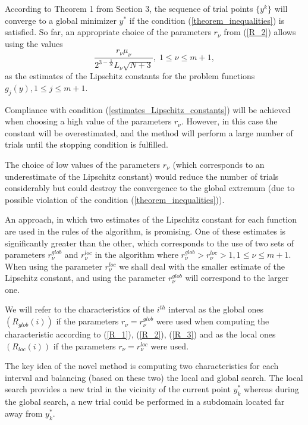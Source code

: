 \documentclass[review]{elsarticle}
\begin{document}
	According to Theorem 1 from Section 3, the sequence of trial points $\{y^k\}$ will converge to a global minimizer $y^\ast$ if the condition (\ref{theorem_inequalities}) is satisfied. So far, an appropriate choice of the parameters $r_{\nu}$ from (\ref{R_2}) allows using the values
\begin{equation}\label{estimates_Lipschitz_constants}
	\frac{r_{\nu}\mu_{\nu}}{2^{3-\frac{1}{N}}L_{\nu}\sqrt{N+3}}, \; 1 \leq \nu \leq m+1, 
\end{equation}
as the estimates of the Lipschitz constants for the problem functions $g_{j}(y), 1 \leq j \leq m+1$.

	Compliance with condition (\ref{estimates_Lipschitz_constants}) will be achieved when choosing a high value of the parameters $r_{\nu}$. However, in this case the constant will be overestimated, and the method will perform a large number of trials until the stopping condition is fulfilled.
	
	The choice of low values of the parameters $r_{\nu}$ (which corresponds to an underestimate of the Lipschitz constant) would reduce the number of trials considerably but could destroy the convergence to the global extremum (due to possible violation of the condition (\ref{theorem_inequalities})).
	
	An approach, in which two estimates of the Lipschitz constant for each function are used in the rules of the algorithm, is promising. One of these estimates is significantly greater than the other, which corresponds to the use of two sets of parameters $r_{\nu}^{glob}$ and $r_{\nu}^{loc}$ in the algorithm where $r_{\nu}^{glob}>r_{\nu}^{loc}>1, 1 \leq \nu \leq m+1$. When using the parameter $r_{\nu}^{loc}$ we shall deal with the smaller estimate of the Lipschitz constant, and using the parameter $r_{\nu}^{glob}$ will correspond to the larger one.
	
	We will refer to the characteristics of the $i^{th}$ interval as the global ones $(R_{glob}(i))$ if the parameters $r_{\nu}=r_{\nu}^{glob}$ were used when computing the characteristic according to (\ref{R_1}), (\ref{R_2}), (\ref{R_3}) and as the local ones  $(R_{loc}(i))$ if the parameters $r_{\nu}=r_{\nu}^{loc}$ were used. 

	The key idea of the novel method is computing two characteristics for each interval and balancing (based on these two) the local and global search. The local search provides a new trial in the vicinity of the current point $y_k^\ast$  whereas during the global search, a new trial could be performed in a subdomain located far away from $y_k^\ast$. 
	
\end{document}
